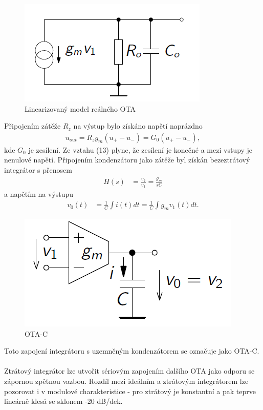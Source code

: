\documentclass[twoside]{article}
\begin{document}
\begin{figure}[H]
\centering
\includegraphics[scale=0.6]{gmrc.png}
\caption{Linearizovaný model reálného OTA \cite{4}}
\end{figure}
\noindent Připojením zátěže $R_z$ na výstup bylo získáno napětí naprázdno
\begin{align}
u_{out} = R_zg_m(u_+ - u_-) = G_0(u_+ - u_-),
\end{align}
kde $G_0$ je zesílení. Ze vztahu (13) plyne, že zesílení je konečné a mezi vstupy je nenulové napětí. Připojením kondenzátoru jako zátěže byl získán bezeztrátový integrátor s přenosem
\begin{align}
H(s) &= \frac{v_2}{v_1} = \frac{g_m}{sC}
\end{align}
\noindent a napětím na výstupu
\begin{align}
v_0(t) &= \frac{1}{C}\int i(t)dt = \frac{1}{C}\int g_mv_1(t)dt.
\end{align}
\begin{figure}[H]
\centering
\includegraphics[scale=0.5]{otaintegrator.png}
\caption{OTA-C \cite{4}}
\end{figure}
\noindent Toto zapojení integrátoru s uzemněným kondenzátorem se označuje jako OTA-C.\\
\\
Ztrátový integrátor lze utvořit sériovým zapojením dalšího OTA jako odporu se zápornou zpětnou vazbou. Rozdíl mezi ideálním a ztrátovým integrátorem lze pozorovat i v modulové charakteristice - pro ztrátový je konstantní a pak teprve lineárně klesá se sklonem -20 dB/dek.
\end{document}
